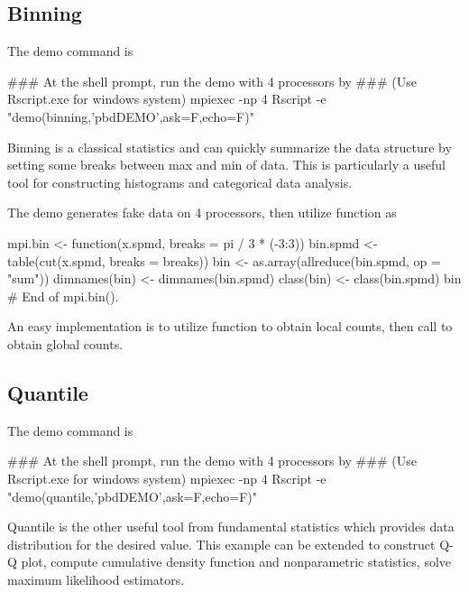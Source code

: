\subsection[Binning]{Binning}
\label{sec:binning}

The demo command is
\begin{Command}
### At the shell prompt, run the demo with 4 processors by
### (Use Rscript.exe for windows system)
mpiexec -np 4 Rscript -e "demo(binning,'pbdDEMO',ask=F,echo=F)"
\end{Command}

Binning is a classical statistics and can quickly summarize
the data structure by setting some breaks between max and min of data.
This is particularly a useful tool for constructing histograms and
categorical data analysis.

The demo  generates fake data on 4 processors, then
utilize  function as
\begin{Code}[title=R Code]
mpi.bin <- function(x.spmd, breaks = pi / 3 * (-3:3)){
  bin.spmd <- table(cut(x.spmd, breaks = breaks))
  bin <- as.array(allreduce(bin.spmd, op = "sum"))
  dimnames(bin) <- dimnames(bin.spmd)
  class(bin) <- class(bin.spmd)
  bin
} # End of mpi.bin().
\end{Code}
An easy implementation is to utilize  function to obtain
local counts, then call  to obtain global counts.



\subsection[Quantile]{Quantile}
\label{sec:quantile}

The demo command is
\begin{Command}
### At the shell prompt, run the demo with 4 processors by
### (Use Rscript.exe for windows system)
mpiexec -np 4 Rscript -e "demo(quantile,'pbdDEMO',ask=F,echo=F)"
\end{Command}

Quantile is the other useful tool from fundamental statistics
which provides data distribution for the desired value.
This example can be extended to construct Q-Q plot,
compute cumulative density function and nonparametric statistics,
solve maximum likelihood estimators.

